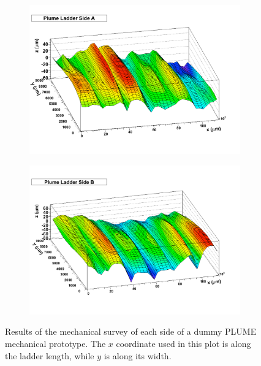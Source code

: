       \begin{figure}[!h]
        \centering
        \begin{subfigure}[t]{0.45\textwidth}
          \centering
          \includegraphics[width = 1.2\textwidth]{Pictures/deformation/surveyResults.pdf}
        \end{subfigure}
        \hfill
        \begin{subfigure}[t]{0.45\textwidth}
          \centering
          \includegraphics[width = 1.2\textwidth]{Pictures/deformation/surveyResultsB.pdf}
        \end{subfigure}

        \caption{Results of the mechanical survey of each side of a dummy PLUME mechanical prototype. The $x$ coordinate used in this plot is along the ladder length, while $y$ is along its width.}
        \label{fig:mechanicalSurvey}
      \end{figure}

